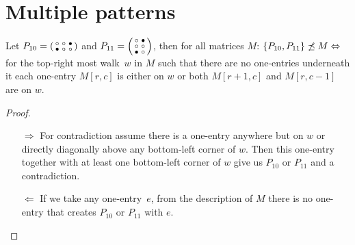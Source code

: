 \section{Multiple patterns}

\begin{prop}
\label{prop:twopatterns}
Let $P_{10}=\left(\begin{smallmatrix}\circ&\circ&\bullet\\\bullet&\circ&\circ\end{smallmatrix}\right)$ and $P_{11}=\left(\begin{smallmatrix}\circ&\bullet\\\circ&\circ\\\bullet&\circ\end{smallmatrix}\right)$, then for all matrices $M$: $\{P_{10},P_{11}\}\not\preceq M\Leftrightarrow$ for the top-right most walk~$w$ in $M$ such that there are no one-entries underneath it each one-entry $M[r,c]$ is either on $w$ or both $M[r+1,c]$ and $M[r,c-1]$ are on $w$.
\end{prop}
\begin{proof}
\begin{itemize}
	\item[$\Rightarrow$] For contradiction assume there is a one-entry anywhere but on $w$ or directly diagonally above any bottom-left corner of $w$. Then this one-entry together with at least one bottom-left corner of $w$ give us $P_{10}$ or $P_{11}$ and a contradiction.
	\item[$\Leftarrow$] If we take any one-entry~$e$, from the description of $M$ there is no one-entry that creates $P_{10}$ or $P_{11}$ with $e$.
\end{itemize}
\end{proof}
